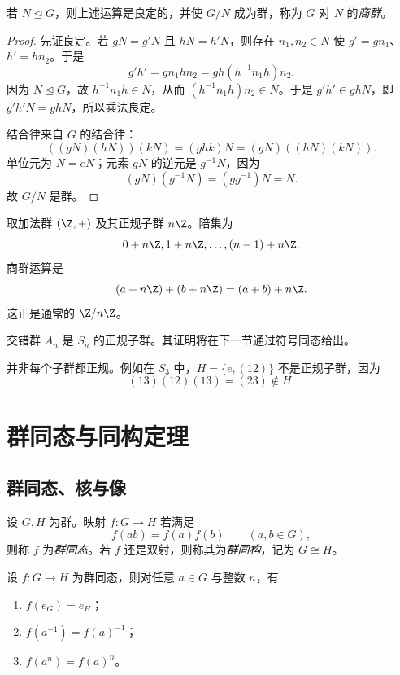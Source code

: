 \begin{proposition}
若 $N\trianglelefteq G$，则上述运算是良定的，并使 $G/N$ 成为群，称为 $G$ 对 $N$ 的\emph{商群}。
\end{proposition}

\begin{proof}
先证良定。若 $gN=g'N$ 且 $hN=h'N$，则存在 $n_1,n_2\in N$ 使 $g'=gn_1$、$h'=hn_2$。于是
\[
 g'h'=gn_1hn_2=gh(h^{-1}n_1h)n_2.
\]
因为 $N\trianglelefteq G$，故 $h^{-1}n_1h\in N$，从而 $(h^{-1}n_1h)n_2\in N$。于是 $g'h'\in ghN$，即 $g'h'N=ghN$，所以乘法良定。

结合律来自 $G$ 的结合律：
\[
 ((gN)(hN))(kN)=(ghk)N=(gN)((hN)(kN)).
\]
单位元为 $N=eN$；元素 $gN$ 的逆元是 $g^{-1}N$，因为
\[
 (gN)(g^{-1}N)=(gg^{-1})N=N.
\]
故 $G/N$ 是群。
\end{proof}

\begin{example}
取加法群 $(\Z,+)$ 及其正规子群 $n\Z$。陪集为
\[
 0+n\Z,1+n\Z,\dots,(n-1)+n\Z.
\]
商群运算是
\[
 (a+n\Z)+(b+n\Z)=(a+b)+n\Z.
\]
这正是通常的 $\Z/n\Z$。
\end{example}

\begin{example}
交错群 $A_n$ 是 $S_n$ 的正规子群。其证明将在下一节通过符号同态给出。
\end{example}

\begin{remark}
并非每个子群都正规。例如在 $S_3$ 中，$H=\{e,(12)\}$ 不是正规子群，因为
\[
 (13)(12)(13)=(23) \notin H.
\]
\end{remark}

\section{群同态与同构定理}

\subsection*{群同态、核与像}

\begin{definition}
设 $G,H$ 为群。映射 $f:G\to H$ 若满足
\[
 f(ab)=f(a)f(b) \qquad (a,b\in G),
\]
则称 $f$ 为\emph{群同态}。若 $f$ 还是双射，则称其为\emph{群同构}，记为 $G\cong H$。
\end{definition}

\begin{proposition}
设 $f:G\to H$ 为群同态，则对任意 $a\in G$ 与整数 $n$，有
\begin{enumerate}[label=\textnormal{(\arabic*)}, leftmargin=3em]
  \item $f(e_G)=e_H$；
  \item $f(a^{-1})=f(a)^{-1}$；
  \item $f(a^n)=f(a)^n$。
\end{enumerate}
\end{proposition}

